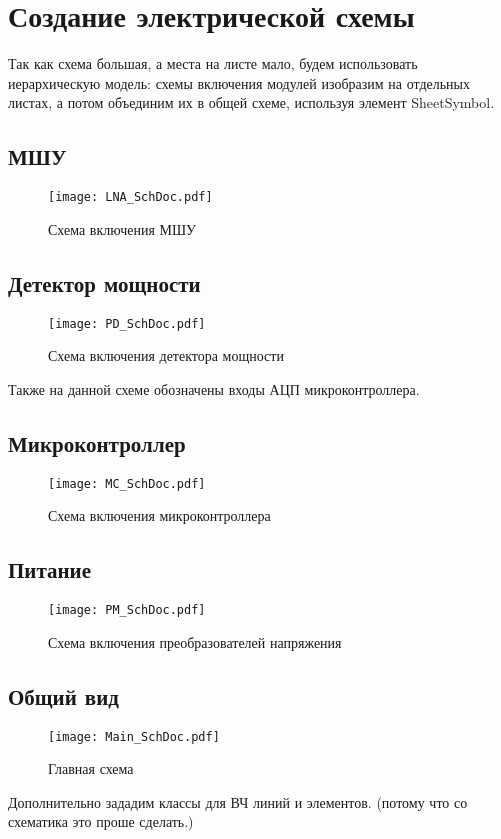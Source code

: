 \chapter{Создание электрической схемы} \label{chap:altium-SchDoc}

Так как схема большая, а места на листе мало, будем использовать иерархическую модель: схемы включения модулей изобразим на отдельных листах, а потом объединим их в общей схеме, используя элемент SheetSymbol.
\section{МШУ}

\begin{figure}[H]
	\centering
	\texttt{[image: LNA\_SchDoc.pdf]}
	\caption{Схема включения МШУ}%
	\label{fig:LNA-SchDoc}
\end{figure}

\section{Детектор мощности}

\begin{figure}[H]
	\centering
	\texttt{[image: PD\_SchDoc.pdf]}
	\caption{Схема включения детектора мощности}%
	\label{fig:PD-SchDoc}
\end{figure}

Также на данной схеме обозначены входы АЦП микроконтроллера.

\section{Микроконтроллер}

\begin{figure}[H]
	\centering
	\texttt{[image: MC\_SchDoc.pdf]}
	\caption{Схема включения микроконтроллера}%
	\label{fig:MC-SchDoc}
\end{figure}

\section{Питание}

\begin{figure}[H]
	\centering
	\texttt{[image: PM\_SchDoc.pdf]}
	\caption{Схема включения преобразователей напряжения}%
	\label{fig:PM-SchDoc}
\end{figure}

\section{Общий вид}

\begin{figure}[H]
	\centering
	\texttt{[image: Main\_SchDoc.pdf]}
	\caption{Главная схема}%
	\label{fig:Main_SchDoc}
\end{figure}

Дополнительно зададим классы для ВЧ линий и элементов. (потому что со схематика это проше сделать.)